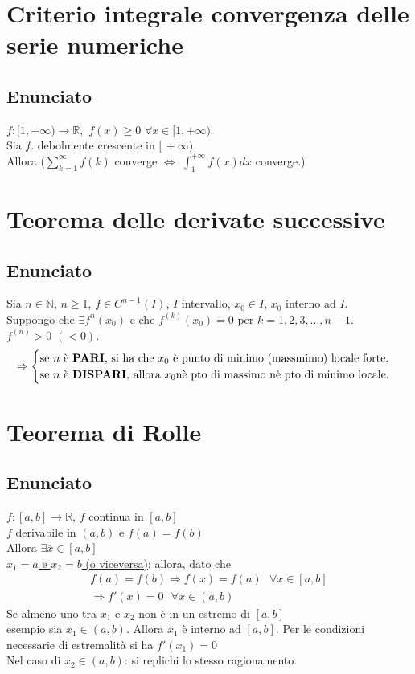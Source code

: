 \documentclass{article}
\newcommand{\R}{\mathbb{R}}
\newcommand{\N}{\mathbb{N}}
\begin{document}
\begin{flushleft}
\section{Criterio integrale convergenza delle serie numeriche}
\subsection{Enunciato}
$f: [1, + \infty ) \rightarrow \R,$ $f(x) \geq 0$ $\forall x \in [1, + \infty)$.
\\Sia $f$. debolmente crescente in $[\, + \infty )$.
\\Allora ($\sum\limits_{k=1}^{\infty} f(k)$ converge $\iff$ $\int_{1}^{+ \infty} f(x) dx$ converge.)

\section{Teorema delle derivate successive}
\subsection{Enunciato}
Sia $n \in \N$, $n \geq 1$, $f \in C^{n-1}(I)$, $I$ intervallo, $x_0 \in I$, $x_0$ interno ad $I$.\\
Suppongo che $\exists f^n(x_0)$ e che $f^{(k)}(x_0)=0$ per $k = 1, 2, 3, ..., n-1$.\\
\hspace*{12.7em}$f^{(n)} > 0$ $(<0)$.\\
\[
    \Rightarrow
    \begin{cases}
        $se $n$ è \textbf{PARI}, si ha che $x_0$ è punto di minimo (massmimo) locale forte.$\\
        $se $n$ è \textbf{DISPARI}, allora $x_0$nè pto di massimo nè pto di minimo locale.$
    \end{cases}
\]


\section{Teorema di Rolle} \label{Rolle}
\subsection{Enunciato}
$f:[a,b] \rightarrow \R$, $f$ continua in $[a,b]$
\\$f$ derivabile in $(a,b)$ e $f(a) = f(b)$
\\Allora $\exists \overline{x} \in [a,b]$
\\\underline{$x_1 = a$ e $x_2 = b$ (o viceversa)}: allora, dato che
\[
    \begin{array}{c}
        f(a) = f(b) \Rightarrow f(x) = f(a) \text{ } \forall x \in [a,b] \\
        \Rightarrow f'(x) = 0 \text{ } \forall x \in (a,b)
    \end{array}
\]
Se almeno uno tra $x_1$ e $x_2$ non è in un estremo di $[a,b]$
\\esempio sia $x_1 \in (a,b)$. Allora $x_1$ è interno ad $[a,b]$. Per le condizioni necessarie di estremalità si ha $f'(x_1) = 0$
\\Nel caso di $x_2 \in (a,b)$: si replichi lo stesso ragionamento.


\end{flushleft}
\end{document}

